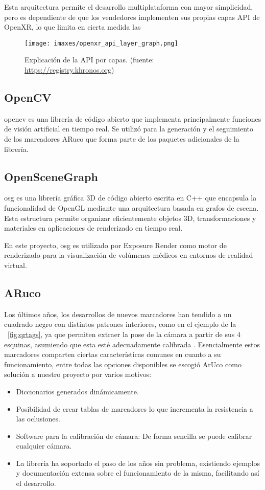 Esta arquitectura permite el desarrollo multiplataforma con mayor simplicidad, pero es dependiente de que los vendedores implementen sus propias capas API de OpenXR, lo que limita en cierta medida las 

\begin{figure}
  \centering
  \texttt{[image: imaxes/openxr\_api\_layer\_graph.png]}
  \caption{Explicación de la API por capas. (fuente: \href{https://registry.khronos.org/OpenXR/specs/1.0/loader.html}{https://registry.khronos.org})}
  \label{fig:openxrapilayer}
\end{figure}

\subsection{OpenCV}
\acrfull{opencv} es una librería de código abierto que implementa principalmente funciones de visión artificial en tiempo real. Se utilizó para la generación y el seguimiento de los marcadores ARuco que forma parte de los paquetes adicionales de la librería.

\subsection{OpenSceneGraph}
\acrfull{osg} es una librería gráfica 3D de código abierto escrita en C++ que encapsula la funcionalidad de OpenGL mediante una arquitectura basada en grafos de escena. Esta estructura permite organizar eficientemente objetos 3D, transformaciones y materiales en aplicaciones de renderizado en tiempo real.

En este proyecto, \acrshort{osg} es utilizado por Exposure Render como motor de renderizado para la visualización de volúmenes médicos en entornos de realidad virtual.

\subsection{ARuco}
Los últimos años, los desarrollos de nuevos marcadores han tendido a un cuadrado negro con distintos patrones interiores, como en el ejemplo de la \figurename~\ref{fig:qrtags}, ya que permiten extraer la pose de la cámara a partir de sus 4 esquinas, asumiendo que esta esté adecuadamente calibrada \cite{GarridoJurado2014}. Esencialmente estos marcadores comparten ciertas características comunes en cuanto a su funcionamiento, entre todas las opciones disponibles se escogió ArUco como solución a nuestro proyecto por varios motivos:
\begin{itemize}
    \item Diccionarios generados dinámicamente.
    \item Posibilidad de crear tablas de marcadores lo que incrementa la resistencia a las oclusiones.
    \item Software para la calibración de cámara: De forma sencilla se puede calibrar cualquier cámara.
    \item La librería ha soportado el paso de los años sin problema, existiendo ejemplos y documentación extensa sobre el funcionamiento de la misma, facilitando así el desarrollo.
\end{itemize}

